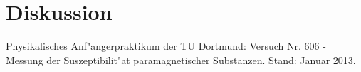 \section{Diskussion}
	\label{diskussion}

\begin{thebibliography}{9}
	 Physikalisches Anf"angerpraktikum der TU Dortmund: Versuch Nr. 606 - Messung der Suszeptibilit"at paramagnetischer Substanzen. Stand: Januar 2013.

\end{thebibliography}
